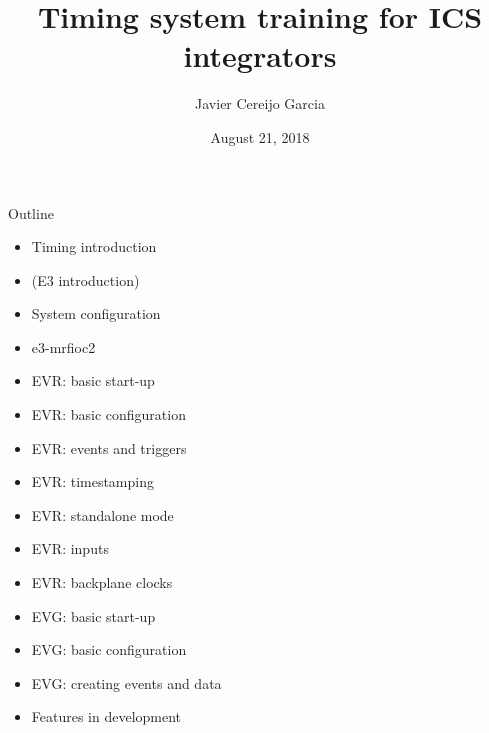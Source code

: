 \documentclass[
  9pt
  , table
  , ignorenonframetext
]{beamer}
\title{Timing system training for ICS integrators}
\author{Javier Cereijo Garcia}%
\institute{
  Integrated Control System Division\\
  \textbf{ESS}, Sweden
}
\date{August 21, 2018}
\begin{document}
\begin{frame}[plain]
  \titlepage
\end{frame}


\begin{frame}{Outline}
    \begin{itemize}
    \item Timing introduction
    \item (E3 introduction)
    \item System configuration
    \item e3-mrfioc2
    \item EVR: basic start-up
    \item EVR: basic configuration
    \item EVR: events and triggers
    \item EVR: timestamping
    \item EVR: standalone mode
    \item EVR: inputs
    \item EVR: backplane clocks
    \item EVG: basic start-up
    \item EVG: basic configuration
    \item EVG: creating events and data
    \item Features in development
    \end{itemize}
\end{frame}
\end{document}
